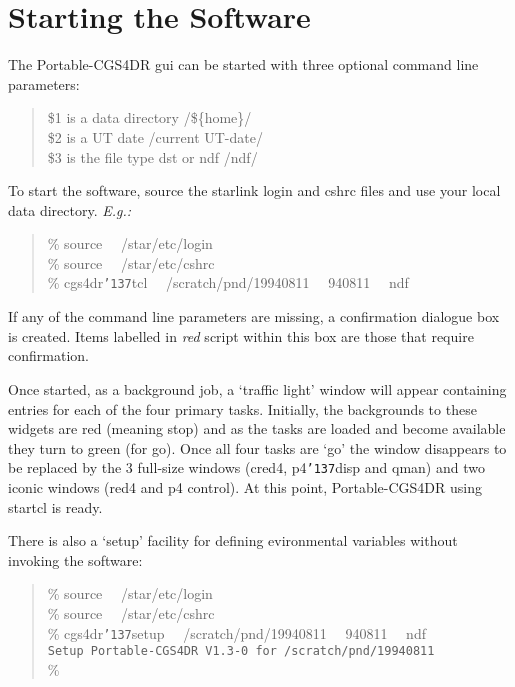 \documentclass[a4paper]{book}
\renewcommand{\_}{{\tt\char'137}}
\begin{document}
\section{Starting the Software}
The Portable-CGS4DR {\sc gui} can be started with three optional command line
parameters: 

\begin{minipage}{120mm}
\begin{quote}
  \$1 is a data directory \hfill /\$\{home\}/ \\
  \$2 is a UT date \hfill /current UT-date/ \\
  \$3 is the file type {\sc dst} or {\sc ndf} \hfill /ndf/
\end{quote}
\end{minipage}

To start the software, source the {\sc starlink} login and cshrc files and
use your local data directory. {\em E.g.:}

\begin{minipage}{120mm}
\begin{quote}
  \%  source \ \ /star/etc/login \\
  \%  source \ \ /star/etc/cshrc \\
  \%  cgs4dr\_tcl \ \ /scratch/pnd/19940811 \ \ 940811 \ \ ndf
\end{quote}
\end{minipage}

If any of the command line parameters are missing, a confirmation dialogue box
is created. Items labelled in {\em red} script within this box are those that
require confirmation.

Once started, as a background job, a `traffic light' window will appear containing entries
for each of the four primary tasks. Initially, the backgrounds to these widgets are red
(meaning stop) and as the tasks are loaded and become available they turn to green (for go).
Once all four tasks are `go' the window disappears to be replaced by the 
3 full-size windows (cred4, p4\_disp and qman) and two iconic windows
(red4 and p4 control). At this point, Portable-CGS4DR using {\sc startcl} is
ready.

There is also a `setup' facility for defining evironmental variables without
invoking the software:

\begin{minipage}{120mm}
\begin{quote}
  \%  source \ \ /star/etc/login \\
  \%  source \ \ /star/etc/cshrc \\
  \%  cgs4dr\_setup \ \ /scratch/pnd/19940811 \ \ 940811 \ \ ndf \\[4ex]
      {\tt Setup Portable-CGS4DR V1.3-0 for /scratch/pnd/19940811} \\[2ex]
  \%
\end{quote}
\end{minipage}
\end{document}
